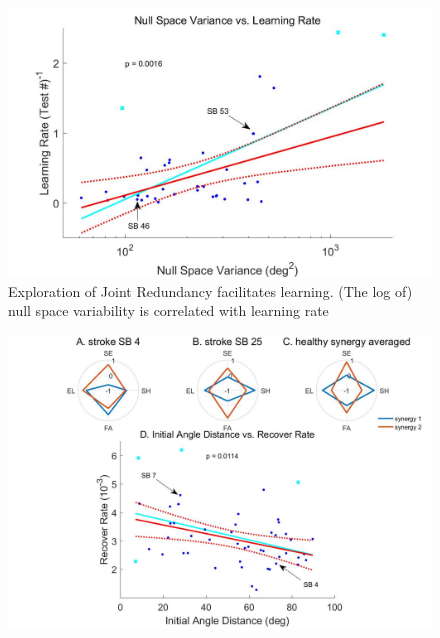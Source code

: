 \begin{figure}
	\centering
	\includegraphics[width=1\linewidth]{figures/5learnRateVSnullVar}
	\caption[Exploration of Joint Redundancy facilitates learning]
	{Exploration of Joint Redundancy facilitates learning. (The log of) null space variability is correlated with learning rate}
	\label{fig:5learnratevsnullvar}
\end{figure}

\begin{figure}
	\centering
	\includegraphics[width=1\linewidth]{figures/6synergy}
	\caption[Abnormal Synergies]{}
	\label{fig:6synergy}
\end{figure}


